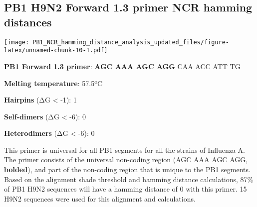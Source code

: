 \documentclass[
]{article}
\newenvironment{Shaded}{\begin{snugshade}}{\end{snugshade}}
\newcommand{\AttributeTok}[1]{\textcolor[rgb]{0.77,0.63,0.00}{#1}}
\newcommand{\DecValTok}[1]{\textcolor[rgb]{0.00,0.00,0.81}{#1}}
\newcommand{\FunctionTok}[1]{\textcolor[rgb]{0.00,0.00,0.00}{#1}}
\newcommand{\NormalTok}[1]{#1}
\newcommand{\OtherTok}[1]{\textcolor[rgb]{0.56,0.35,0.01}{#1}}
\newcommand{\SpecialCharTok}[1]{\textcolor[rgb]{0.00,0.00,0.00}{#1}}
\newcommand{\StringTok}[1]{\textcolor[rgb]{0.31,0.60,0.02}{#1}}
\begin{document}
\hypertarget{pb1-h9n2-forward-1.3-primer-ncr-hamming-distances}{%
\subsection{PB1 H9N2 Forward 1.3 primer NCR hamming
distances}\label{pb1-h9n2-forward-1.3-primer-ncr-hamming-distances}}

\begin{Shaded}
\end{Shaded}

\texttt{[image: PB1\_NCR\_hamming\_distance\_analysis\_updated\_files/figure-latex/unnamed-chunk-10-1.pdf]}

\textbf{PB1 Forward 1.3 primer}: \textbf{AGC AAA AGC AGG} CAA ACC ATT TG

\textbf{Melting temperature}: 57.5ºC

\textbf{Hairpins} (ΔG \textless{} -1): 1

\textbf{Self-dimers} (ΔG \textless{} -6): 0

\textbf{Heterodimers} (ΔG \textless{} -6): 0

This primer is universal for all PB1 segments for all the strains of
Influenza A. The primer consists of the universal non-coding region (AGC
AAA AGC AGG, \textbf{bolded}), and part of the non-coding region that is
unique to the PB1 segments. Based on the alignment shade threshold and
hamming distance calculations, 87\% of PB1 H9N2 sequences will have a
hamming distance of 0 with this primer. 15 H9N2 sequences were used for
this alignment and calculations.
\end{document}
